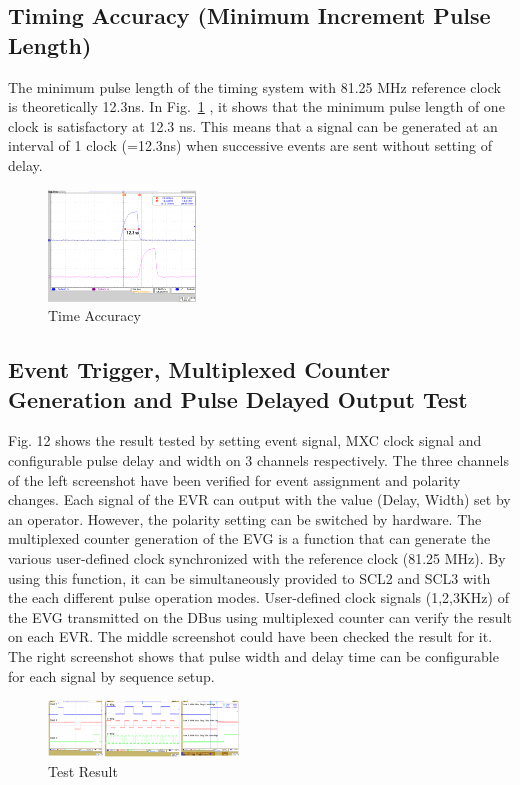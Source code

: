 \documentclass[journal,reqno]{IEEEtran}
\begin{document}
\subsection{Timing Accuracy (Minimum Increment Pulse Length)}
The minimum pulse length of the timing system with 81.25 MHz reference clock is theoretically 12.3ns. In Fig.~\ref{accuracy} , it shows that the minimum pulse length of one clock is satisfactory at 12.3 ns. This means that a signal can be generated at an interval of 1 clock (=12.3ns) when successive events are sent without setting of delay.

\begin{figure}[!htb]
	\centering
	\includegraphics*[width=0.35\textwidth, height=0.15\textwidth]{accuracy.png}
	\caption{Time Accuracy}
	\label{accuracy}
\end{figure}

\subsection{Event Trigger, Multiplexed Counter Generation and Pulse Delayed Output Test}
Fig. 12 shows the result tested by setting event signal, MXC clock signal and configurable pulse delay and width on 3 channels respectively. The three channels of the left screenshot have been verified for event assignment and polarity changes. Each signal of the EVR can output with the value (Delay, Width) set by an operator. However, the polarity setting can be switched by hardware. The multiplexed counter generation of the EVG is a function that can generate the various user-defined clock synchronized with the reference clock (81.25 MHz). By using this function, it can be simultaneously provided to SCL2 and SCL3 with the each different pulse operation modes. User-defined clock signals (1,2,3KHz) of the EVG transmitted on the DBus using multiplexed counter can verify the result on each EVR. The middle screenshot could have been checked the result for it. The right screenshot shows that pulse width and delay time can be configurable for each signal by sequence setup.

\begin{figure}[!htb]
	\centering
	\includegraphics*[width=0.45\textwidth, height=0.20\textwidth]{img22.png}
	\caption{Test Result}
	\label{timing_result}
\end{figure}
 
\end{document}
